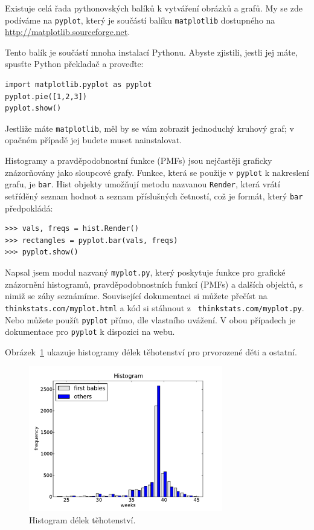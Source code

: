 \documentclass[12pt]{book}
\begin{document}
Existuje celá řada pythonovských balíků k vytváření obrázků a grafů.
My se zde podíváme na  {\tt pyplot}, který je součástí
balíku {\tt matplotlib} dostupného na \url{http://matplotlib.sourceforge.net}.

Tento balík je součástí mnoha instalací Pythonu.  Abyste zjistili, jestli jej máte, spusťte Python překladač a proveďte:
%
\begin{verbatim}
import matplotlib.pyplot as pyplot
pyplot.pie([1,2,3])
pyplot.show()
\end{verbatim}

Jestliže máte {\tt matplotlib}, měl by se vám zobrazit jednoduchý kruhový graf;
v opačném případě jej budete muset nainstalovat.

Histogramy a pravděpodobnostní funkce (PMFs) jsou nejčastěji graficky znázorňovány jako sloupcové grafy. Funkce, která se použije v {\tt pyplot} k nakreslení grafu, je {\tt bar}.  Hist
objekty umožňují metodu nazvanou {\tt Render}, která vrátí setříděný seznam hodnot  a seznam příslušných četností, což je formát, který {\tt bar} předpokládá:
%
\begin{verbatim}
>>> vals, freqs = hist.Render()
>>> rectangles = pyplot.bar(vals, freqs)
>>> pyplot.show()
\end{verbatim}

Napsal jsem modul nazvaný {\tt myplot.py}, který poskytuje funkce pro grafické znázornění histogramů, pravděpodobnostních funkcí (PMFs) a dalších objektů, s nimiž se záhy seznámíme.
Související dokumentaci si můžete přečíst na {\tt
  thinkstats.com/myplot.html} a kód si stáhnout z {\tt
  thinkstats.com/myplot.py}.  Nebo můžete použít {\tt pyplot} přímo, dle vlastního uvážení.  V obou případech je dokumentace pro {\tt pyplot} k dispozici na  webu.

Obrázek~\ref{nsfg_hist} ukazuje histogramy délek těhotenství pro prvorozené děti a ostatní.

\begin{figure}
\centerline{\includegraphics[height=2.5in]{figs/nsfg_hist.pdf}}
\caption{Histogram délek těhotenství.}
\label{nsfg_hist}
\end{figure}
\end{document}

